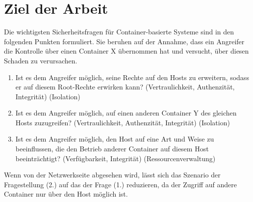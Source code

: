 \documentclass[../main.tex]{subfiles}
\begin{document}
\chapter{Ziel der Arbeit}
\label{question}


  Die wichtigsten Sicherheitsfragen für Container-basierte Systeme sind in den folgenden Punkten formuliert. Sie beruhen auf der Annahme, dass ein Angreifer die Kontrolle über einen Container X übernommen hat und versucht, über diesen Schaden zu verursachen.

  \begin{enumerate}
    \item Ist es dem Angreifer möglich, seine Rechte auf den Hosts zu erweitern, sodass er auf diesem Root-Rechte erwirken kann? (Vertraulichkeit, Authenzität, Integrität) (Isolation)
    \item Ist es dem Angreifer möglich, auf einen anderen Container Y des gleichen Hosts zuzugreifen? (Vertraulichkeit, Authenzität, Integrität) (Isolation)
    \item Ist es dem Angreifer möglich, den Host auf eine Art und Weise zu beeinflussen, die den Betrieb anderer Container auf diesem Host beeinträchtigt? (Verfügbarkeit, Integrität) (Ressourcenverwaltung)
  \end{enumerate}

  Wenn von der Netzwerkseite abgesehen wird, lässt sich das Szenario der Fragestellung (2.) auf das der Frage (1.) reduzieren, da der Zugriff auf andere Container nur über den Host möglich ist.

\end{document}
